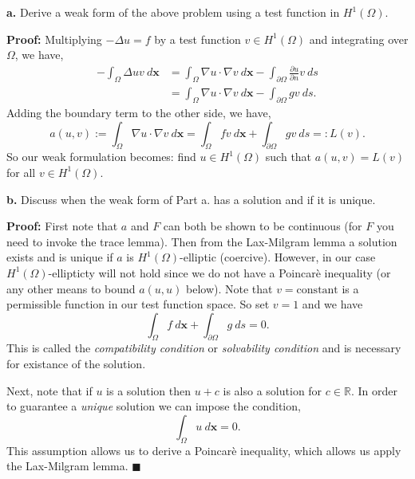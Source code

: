 \documentclass[11pt]{article}
\newcommand{\bs}{\boldsymbol}
\begin{document}
\vskip 1cm

\textbf{a.} Derive a weak form of the above problem using a test function in $H^1(\Omega)$.


\vskip 1cm

\textbf{Proof:} Multiplying $-\Delta u = f$ by a test function $v \in H^1(\Omega)$ and integrating over $\Omega$, we have,
\begin{align*}
	-\int_\Omega \Delta u v \: d\bs{x} &= \int_\Omega \nabla u \cdot \nabla v \: d\bs{x} - \int_{\partial \Omega} \frac{\partial u}{\partial n} v \: ds \\
	&= \int_\Omega \nabla u \cdot \nabla v \: d\bs{x} - \int_{\partial \Omega} g v \: ds.
\end{align*}
Adding the boundary term to the other side, we have,
\begin{equation*}
	a(u,v) := \int_\Omega \nabla u \cdot \nabla v \: d\bs{x} = \int_\Omega f v \: d\bs{x} + \int_{\partial \Omega} g v \: ds =: L(v).
\end{equation*}
So our weak formulation becomes: find $u\in H^1(\Omega)$ such that $a(u,v) = L(v)$ for all $v \in H^1(\Omega)$.
 



\vskip 2cm


\textbf{b.} Discuss when the weak form of Part a. has a solution and if it is unique.

\vskip 1cm

\textbf{Proof:} First note that $a$ and $F$ can both be shown to be continuous (for $F$ you need to invoke the trace lemma).
Then from the Lax-Milgram lemma a solution exists and is unique if $a$ is $H^1(\Omega)$-elliptic (coercive). 
However, in our case $H^1(\Omega)$-ellipticty will not hold since we do not have a Poincar\`{e} inequality (or any other means to bound $a(u,u)$ below).
Note that $v = \text{constant}$ is a permissible function in our test function space. 
So set $v = 1$ and we have
\begin{equation*}
	\int_\Omega f \: d\bs{x} + \int_{\partial \Omega} g \: ds = 0.
\end{equation*}
This is called the \textit{compatibility condition} or \textit{solvability condition} and is necessary for existance of the solution.

Next, note that if $u$ is a solution then $u + c$ is also a solution for $c \in \mathbb{R}$.
In order to guarantee a \textit{unique} solution we can impose the condition,
\begin{equation*}
	\int_\Omega u \: d\bs{x} = 0.
\end{equation*}
This assumption allows us to derive a Poincar\`{e} inequality, which allows us apply the Lax-Milgram lemma.
$\blacksquare$
\end{document}
